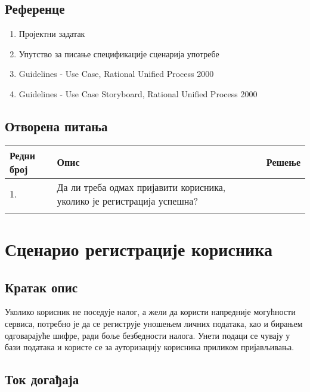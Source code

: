 \documentclass[12pt,a4paper]{article}
\begin{document}
\subsection{Референце}
 
\begin{enumerate}
  \item Пројектни задатак
  \item Упутство за писање спецификације сценарија употребе
  \item Guidelines - Use Case, Rational Unified Process 2000
  \item Guidelines - Use Case Storyboard, Rational Unified Process 2000
\end{enumerate}

\subsection{Отворена питања}

\noindent
\setcellgapes{4pt}
\makegapedcells
\begin{tabularx}{\linewidth}{|l|X|X|}
    \hline
    \textbf{Редни број} & \textbf{Опис} & \textbf{Решење} \\
    \hline
    1. & Да ли треба одмах пријавити корисника, уколико је регистрација успешна? &  \\
    \hline
    & &  \\
    \hline
\end{tabularx}
\section{Сценарио регистрације корисника}
\subsection{Кратак опис}
Уколико корисник не поседује налог, а жели да користи напредније могућности сервиса, потребно је да
се региструје уношењем личних података, као и бирањем одговарајуће шифре, ради боље безбедности налога. Унети
подаци се чувају у бази података и користе се за ауторизацију корисника приликом пријављивања.
\newpage
\subsection{Ток догађаја}
\end{document}
